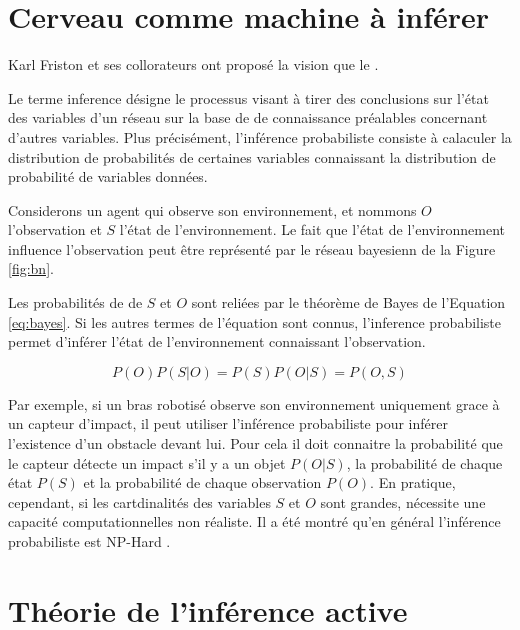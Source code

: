 \section{Cerveau comme machine à inférer}

Karl Friston et ses collorateurs ont proposé la vision que le . 

Le terme inference désigne le processus visant à tirer des conclusions sur l'état des variables d'un réseau sur la base de de connaissance préalables concernant d'autres variables. 
Plus précisément, l'inférence probabiliste consiste à calaculer la distribution de probabilités de certaines variables connaissant la distribution de probabilité de variables données. 

Considerons un agent qui observe son environnement, et nommons $O$ l'observation et $S$ l'état de l'environnement.
Le fait que l'état de l'environnement influence l'observation peut être représenté par le réseau bayesienn de la Figure \ref{fig:bn}.



Les probabilités de de $S$ et $O$ sont reliées par le théorème de Bayes de l'Equation \eqref{eq:bayes}. 
Si les autres termes de l'équation sont connus, l'inference probabiliste permet d'inférer l'état de l'environnement connaissant l'observation.

\begin{equation}
	\label{eq:bayes}
	P (O) P(S|O) = P(S)P(O|S) = P (O, S) 
\end{equation} 

Par exemple, si un bras robotisé observe son environnement uniquement grace à un capteur d'impact, il peut utiliser l'inférence probabiliste pour inférer l'existence d'un obstacle devant lui. 
Pour cela il doit connaitre la probabilité que le capteur détecte un impact s'il y a un objet $P(O|S)$, la probabilité de chaque état $P(S)$ et la probabilité de chaque observation $P(O)$.
En pratique, cependant, si les cartdinalités des variables $S$ et $O$ sont grandes, nécessite une capacité computationnelles non réaliste. 
Il a été montré qu'en général l'inférence probabiliste est NP-Hard \cite{cooper_computational_1990}.



\section{Théorie de l'inférence active}
\label{sec:active_inference}



